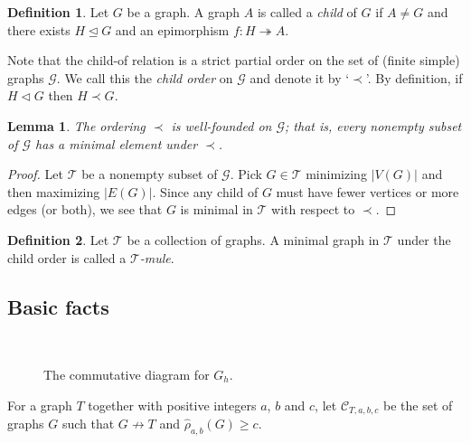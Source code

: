 \documentclass[12pt]{amsart}
\theoremstyle{plain}
\newtheorem{lem}[thm]{Lemma}
\theoremstyle{definition}
\newtheorem{defn}{Definition}
\theoremstyle{remark}
\newcommand{\fancy}[1]{\mathcal{#1}}
\newcommand{\C}{\fancy{C}}
\newcommand{\surj}{\twoheadrightarrow}
\newcommand{\card}[1]{\left|#1\right|}
\newcommand{\funcsurj}[3]{#1\colon #2 \surj #3}
\begin{document}
\begin{defn}
\label{child}
Let $G$ be a graph.  A graph $A$ is called a \emph{child} of $G$ if $A \neq G$
and there exists $H \unlhd G$ and an epimorphism $\funcsurj{f}{H}{A}$.  
\end{defn}

Note that the child-of relation is a strict partial order on the set of (finite
simple) graphs $\fancy{G}$.  We call this the \emph{child order} on $\fancy{G}$
and denote it by `$\prec$'.  By definition, if $H \lhd G$ then $H \prec G$.

\begin{lem}\label{well-founded}
The ordering $\prec$ is well-founded on $\fancy{G}$; that is, every nonempty
subset of $\fancy{G}$ has a minimal element under $\prec$.
\end{lem}
\begin{proof}
Let $\fancy{T}$ be a nonempty subset of $\fancy{G}$.  Pick $G \in \fancy{T}$
minimizing $\card{V(G)}$ and then maximizing $\card{E(G)}$.  
Since any child of $G$ must have fewer vertices or more edges (or both), we see
that $G$ is minimal in $\fancy{T}$ with respect to $\prec$.
\end{proof}

\begin{defn}
Let $\fancy{T}$ be a collection of graphs.  A minimal graph in $\fancy{T}$
under the child order is called a \emph{$\fancy{T}$-mule}.
\end{defn}
\smallskip

\subsection{Basic facts}~\\
\begin{figure}
\begin{center}
\begin{Large}
\end{Large}
\end{center}
\caption{The commutative diagram for $G_h$.}
\label{fig:G_h}
\end{figure}
For a graph $T$ together with positive integers $a$, $b$ and $c$, let $\C_{T,a,b,c}$ be the set of graphs $G$ such that $G \not \rightarrow T$ and $\hat{\rho}_{a,b}(G) \ge c$.  
\end{document}
